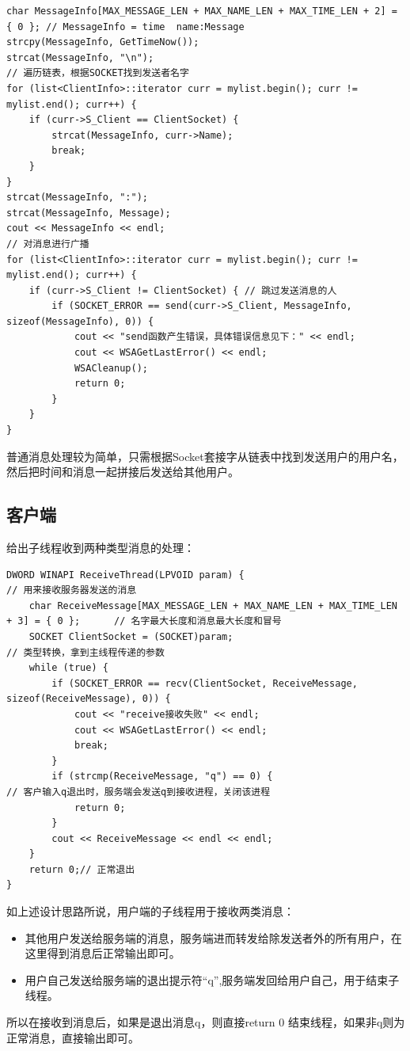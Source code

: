 \documentclass[UTF8,a4paper,10pt]{ctexart}
\begin{document}
\begin{lstlisting}
char MessageInfo[MAX_MESSAGE_LEN + MAX_NAME_LEN + MAX_TIME_LEN + 2] = { 0 }; // MessageInfo = time  name:Message
strcpy(MessageInfo, GetTimeNow());
strcat(MessageInfo, "\n");
// 遍历链表，根据SOCKET找到发送者名字
for (list<ClientInfo>::iterator curr = mylist.begin(); curr != mylist.end(); curr++) {
    if (curr->S_Client == ClientSocket) {
        strcat(MessageInfo, curr->Name);
        break;
    }
}
strcat(MessageInfo, ":");
strcat(MessageInfo, Message);
cout << MessageInfo << endl;
// 对消息进行广播
for (list<ClientInfo>::iterator curr = mylist.begin(); curr != mylist.end(); curr++) {
    if (curr->S_Client != ClientSocket) { // 跳过发送消息的人
        if (SOCKET_ERROR == send(curr->S_Client, MessageInfo, sizeof(MessageInfo), 0)) {
            cout << "send函数产生错误，具体错误信息见下：" << endl;
            cout << WSAGetLastError() << endl;
            WSACleanup();
            return 0;
        }
    }
}

\end{lstlisting}\par
普通消息处理较为简单，只需根据Socket套接字从链表中找到发送用户的用户名，然后把时间和消息一起拼接后发送给其他用户。
\subsection{客户端}
给出子线程收到两种类型消息的处理：\par
\begin{lstlisting}
DWORD WINAPI ReceiveThread(LPVOID param) {                                               // 用来接收服务器发送的消息
    char ReceiveMessage[MAX_MESSAGE_LEN + MAX_NAME_LEN + MAX_TIME_LEN + 3] = { 0 };      // 名字最大长度和消息最大长度和冒号
    SOCKET ClientSocket = (SOCKET)param;                                                 // 类型转换，拿到主线程传递的参数
    while (true) {
        if (SOCKET_ERROR == recv(ClientSocket, ReceiveMessage, sizeof(ReceiveMessage), 0)) {
            cout << "receive接收失败" << endl;
            cout << WSAGetLastError() << endl;
            break;
        }
        if (strcmp(ReceiveMessage, "q") == 0) {                              // 客户输入q退出时，服务端会发送q到接收进程，关闭该进程
            return 0;
        }
        cout << ReceiveMessage << endl << endl;
    }
    return 0;// 正常退出
}
\end{lstlisting}\par
如上述设计思路所说，用户端的子线程用于接收两类消息：
\begin{itemize}
\item 其他用户发送给服务端的消息，服务端进而转发给除发送者外的所有用户，在这里得到消息后正常输出即可。
\item 用户自己发送给服务端的退出提示符“q”,服务端发回给用户自己，用于结束子线程。
\end{itemize}
所以在接收到消息后，如果是退出消息q，则直接return 0 结束线程，如果非q则为正常消息，直接输出即可。
\end{document}

